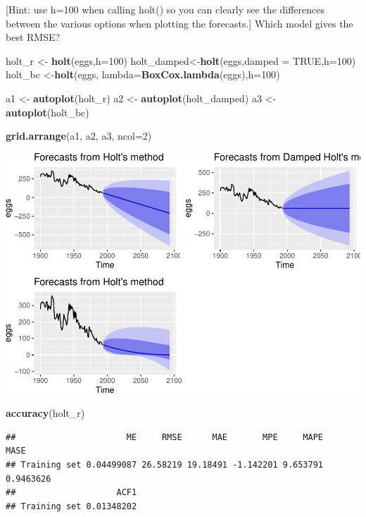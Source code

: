 \documentclass[]{article}
\newenvironment{Shaded}{\begin{snugshade}}{\end{snugshade}}
\newcommand{\KeywordTok}[1]{\textcolor[rgb]{0.13,0.29,0.53}{\textbf{#1}}}
\newcommand{\DataTypeTok}[1]{\textcolor[rgb]{0.13,0.29,0.53}{#1}}
\newcommand{\DecValTok}[1]{\textcolor[rgb]{0.00,0.00,0.81}{#1}}
\newcommand{\StringTok}[1]{\textcolor[rgb]{0.31,0.60,0.02}{#1}}
\newcommand{\OtherTok}[1]{\textcolor[rgb]{0.56,0.35,0.01}{#1}}
\newcommand{\NormalTok}[1]{#1}
\begin{document}
{[}Hint: use h=100 when calling holt() so you can clearly see the
differences between the various options when plotting the forecasts.{]}
Which model gives the best RMSE?

\begin{Shaded}
\begin{Highlighting}[]
\NormalTok{holt_r <-}\StringTok{ }\KeywordTok{holt}\NormalTok{(eggs,}\DataTypeTok{h=}\DecValTok{100}\NormalTok{)}
\NormalTok{holt_damped<-}\KeywordTok{holt}\NormalTok{(eggs,}\DataTypeTok{damped =} \OtherTok{TRUE}\NormalTok{,}\DataTypeTok{h=}\DecValTok{100}\NormalTok{)}
\NormalTok{holt_bc <-}\KeywordTok{holt}\NormalTok{(eggs, }\DataTypeTok{lambda=}\KeywordTok{BoxCox.lambda}\NormalTok{(eggs),}\DataTypeTok{h=}\DecValTok{100}\NormalTok{)}

\NormalTok{a1 <-}\StringTok{ }\KeywordTok{autoplot}\NormalTok{(holt_r)}
\NormalTok{a2 <-}\StringTok{ }\KeywordTok{autoplot}\NormalTok{(holt_damped)}
\NormalTok{a3 <-}\StringTok{ }\KeywordTok{autoplot}\NormalTok{(holt_bc)}

\KeywordTok{grid.arrange}\NormalTok{(a1, a2, a3, }\DataTypeTok{ncol=}\DecValTok{2}\NormalTok{)}
\end{Highlighting}
\end{Shaded}

\includegraphics{Hw4_files/figure-latex/unnamed-chunk-16-1.pdf}

\begin{Shaded}
\begin{Highlighting}[]
\KeywordTok{accuracy}\NormalTok{(holt_r)}
\end{Highlighting}
\end{Shaded}

\begin{verbatim}
##                      ME     RMSE      MAE       MPE     MAPE      MASE
## Training set 0.04499087 26.58219 19.18491 -1.142201 9.653791 0.9463626
##                    ACF1
## Training set 0.01348202
\end{verbatim}
\end{document}
